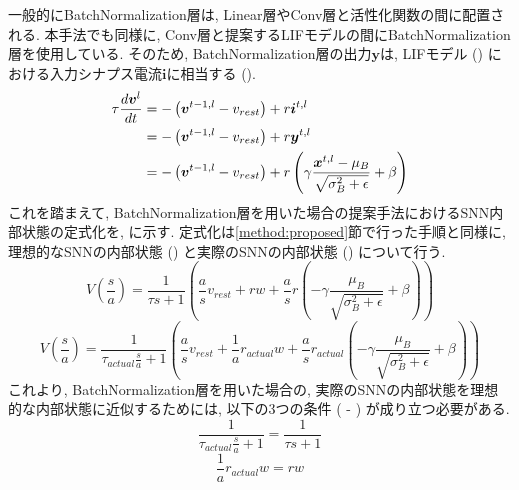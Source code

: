 一般的にBatchNormalization層は, Linear層やConv層と活性化関数の間に配置される.
本手法でも同様に, Conv層と提案するLIFモデルの間にBatchNormalization層を使用している.
そのため, BatchNormalization層の出力$\bm{y}$は, LIFモデル () における入力シナプス電流$\bm{i}$に相当する ().
\begin{align}
    {\tau}\frac{d\bm{v}^l}{dt}&=-\left(\bm{v}^{t-1,l}-v_{rest}\right)+r\bm{i}^{t, l} \notag \\
    &=-\left(\bm{v}^{t-1,l}-v_{rest}\right)+r\bm{y}^{t, l} \notag \\
    &=-\left(\bm{v}^{t-1,l}-v_{rest}\right)+r\left(\gamma \frac{\bm{x}^{t,l}-\mu_B}{\sqrt{\sigma_B^2+\epsilon}} +\beta\right)
    \label{eq:batchnormalization:lif}
\end{align}
これを踏まえて, BatchNormalization層を用いた場合の提案手法におけるSNN内部状態の定式化を, に示す.
定式化は\ref{method:proposed}節で行った手順と同様に, 理想的なSNNの内部状態 () と実際のSNNの内部状態 () について行う.
\begin{equation}
    V\left(\frac{s}{a}\right) =  \frac{1}{\tau s +1}\left( 
        \frac{a}{s} v_{rest} +rw 
        + \frac{a}{s}r \left(-\gamma \frac{\mu_B}{\sqrt{\sigma_B^2+\epsilon}} +\beta\right)   
    \right)
    \label{eq:batchnormalization:lif:ideal}
\end{equation}
\begin{equation}
    V\left(\frac{s}{a}\right) =  \frac{1}{\tau_{actual} \frac{s}{a} +1}\left( 
        \frac{a}{s} v_{rest} +\frac{1}{a} r_{actual} w
        + \frac{a}{s} r_{actual} \left(-\gamma \frac{\mu_B}{\sqrt{\sigma_B^2+\epsilon}} +\beta\right) 
    \right) 
    \label{eq:batchnormalization:lif:actual}
\end{equation}
これより, BatchNormalization層を用いた場合の, 実際のSNNの内部状態を理想的な内部状態に近似するためには, 以下の3つの条件 ( - ) が成り立つ必要がある.
\begin{equation}
    \frac{1}{\tau_{actual} \frac{s}{a} +1} = \frac{1}{\tau s +1}  
    \label{eq:batchnormalization:lif:approximation:condition1}
\end{equation}
\begin{equation}
    \frac{1}{a} r_{actual} w  = r w  
    \label{eq:batchnormalization:lif:approximation:condition2}
\end{equation}
